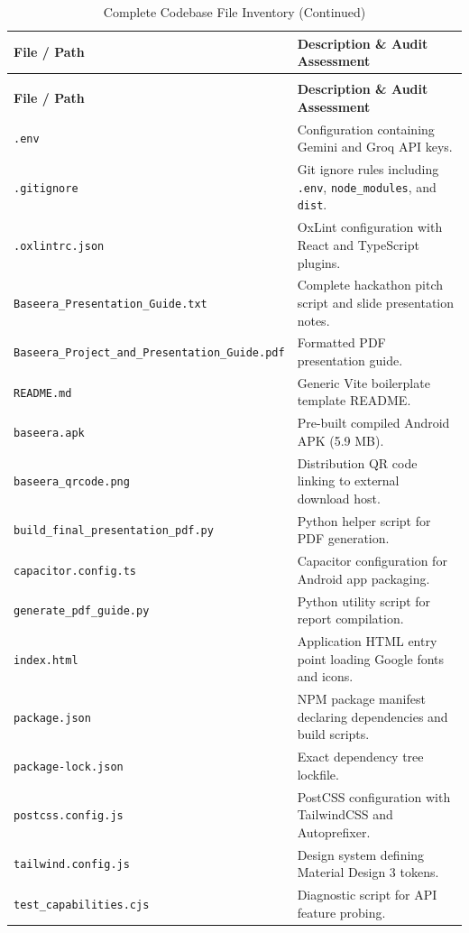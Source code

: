 \documentclass[10pt,a4paper]{report}
\begin{document}
\begin{longtable}{p{5.5cm} p{10.5cm}}
\caption{Complete Codebase File Inventory} \label{tab:app_files} \\
\toprule
\textbf{File / Path} & \textbf{Description \& Audit Assessment} \\
\midrule
\endfirsthead
\caption[]{Complete Codebase File Inventory (Continued)} \\
\toprule
\textbf{File / Path} & \textbf{Description \& Audit Assessment} \\
\midrule
\endhead
\bottomrule
\endfoot
\texttt{.env} & Configuration containing Gemini and Groq API keys. \\
\texttt{.gitignore} & Git ignore rules including \texttt{.env}, \texttt{node\_modules}, and \texttt{dist}. \\
\texttt{.oxlintrc.json} & OxLint configuration with React and TypeScript plugins. \\
\texttt{Baseera\_Presentation\_Guide.txt} & Complete hackathon pitch script and slide presentation notes. \\
\texttt{Baseera\_Project\_and\_Presentation\_Guide.pdf} & Formatted PDF presentation guide. \\
\texttt{README.md} & Generic Vite boilerplate template README. \\
\texttt{baseera.apk} & Pre-built compiled Android APK (5.9 MB). \\
\texttt{baseera\_qrcode.png} & Distribution QR code linking to external download host. \\
\texttt{build\_final\_presentation\_pdf.py} & Python helper script for PDF generation. \\
\texttt{capacitor.config.ts} & Capacitor configuration for Android app packaging. \\
\texttt{generate\_pdf\_guide.py} & Python utility script for report compilation. \\
\texttt{index.html} & Application HTML entry point loading Google fonts and icons. \\
\texttt{package.json} & NPM package manifest declaring dependencies and build scripts. \\
\texttt{package-lock.json} & Exact dependency tree lockfile. \\
\texttt{postcss.config.js} & PostCSS configuration with TailwindCSS and Autoprefixer. \\
\texttt{tailwind.config.js} & Design system defining Material Design 3 tokens. \\
\texttt{test\_capabilities.cjs} & Diagnostic script for API feature probing. \\

\end{longtable}
\end{document}
